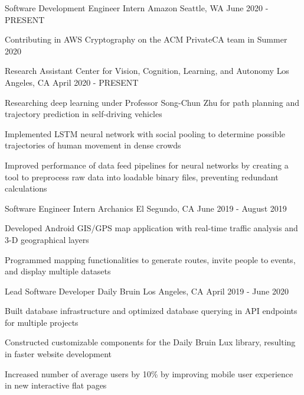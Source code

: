 \documentclass[12pt, letterpaper]{awesome-cv}
\begin{document}
\begin{cventries}
  \cventry
    {Software Development Engineer Intern} %
    {Amazon} %
    {Seattle, WA} %
    {June 2020 - PRESENT} %
    {
      \begin{cvitems} %
        \item {Contributing in AWS Cryptography on the ACM PrivateCA team in Summer 2020}
      \end{cvitems}
    }

  \cventry
    {Research Assistant} %
    {Center for Vision, Cognition, Learning, and Autonomy} %
    {Los Angeles, CA} %
    {April 2020 - PRESENT} %
    {
      \begin{cvitems} %
        \item {Researching deep learning under Professor Song-Chun Zhu for path planning and trajectory prediction in self-driving vehicles}
        \item {Implemented LSTM neural network with social pooling to determine possible trajectories of human movement in dense crowds}
        \item {Improved performance of data feed pipelines for neural networks by creating a tool to preprocess raw data into loadable binary files, preventing redundant calculations}
      \end{cvitems}
    }

  \cventry
    {Software Engineer Intern} %
    {Archanics} %
    {El Segundo, CA} %
    {June 2019 - August 2019} %
    {
      \begin{cvitems} %
        \item {Developed Android GIS/GPS map application with real-time traffic analysis and 3-D geographical layers}
        \item {Programmed mapping functionalities to generate routes, invite people to events, and display multiple datasets}
      \end{cvitems}
    }

  \cventry
    {Lead Software Developer} %
    {Daily Bruin} %
    {Los Angeles, CA} %
    {April 2019 - June 2020} %
    {
      \begin{cvitems} %
        \item {Built database infrastructure and optimized database querying in API endpoints for multiple projects}
		    \item {Constructed customizable components for the Daily Bruin Lux library, resulting in faster website development}
		    \item {Increased number of average users by 10\% by improving mobile user experience in new interactive flat pages}
      \end{cvitems}
    }

\end{cventries}
\end{document}
